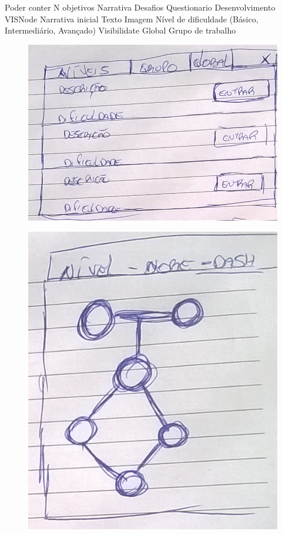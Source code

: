 \documentclass[
	12pt,				%
	oneside,			%
	a4paper,			%
	english,			%
	french,				%
	spanish,			%
	brazil,				%
	]{abntex2}
\begin{document}
Poder conter N objetivos
Narrativa
Desafios
Questionario
Desenvolvimento VISNode
Narrativa inicial
Texto
Imagem
Nível de dificuldade (Básico, Intermediário, Avançado)
Visibilidate
Global
Grupo de trabalho

\begin{figure}[ht]
\centering
\includegraphics[width=1\textwidth]{imagens/proposta_niveis.png}
\end{figure}

\begin{figure}[ht]
\centering
\includegraphics[width=1\textwidth]{imagens/proposta_nivel.png}
\end{figure}
\end{document}
